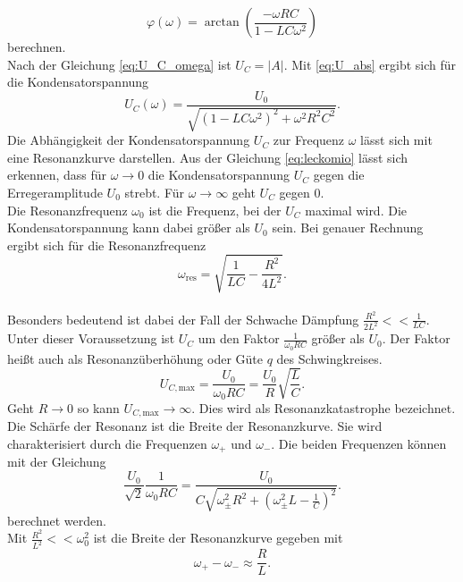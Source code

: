 \begin{equation}\label{eq:phi}
    φ(ω) = \arctan{\left(\frac{-ωRC}{1 - LCω^2}\right)}
\end{equation} berechnen.\\
Nach der Gleichung \eqref{eq:U_C_omega} ist $U_C = |A|.$ Mit \autoref{eq:U_abs} ergibt sich für die Kondensatorspannung
\begin{equation}\label{eq:leckomio}
    U_C(ω) = \frac{U_0}{\sqrt{\left(1 - LCω^2\right)^2 + ω^2R^2C^2}}.
\end{equation}
Die Abhängigkeit der Kondensatorspannung $U_C$ zur Frequenz $ω$ lässt sich mit eine Resonanzkurve darstellen.
Aus der Gleichung \eqref{eq:leckomio} lässt sich erkennen, dass für $ω \longrightarrow 0$ die Kondensatorspannung $U_C$ gegen die Erregeramplitude $U_0$ strebt.
Für $ω \longrightarrow \infty$ geht $U_C$ gegen $0.$\\
Die Resonanzfrequenz $ω_0$ ist die Frequenz, bei der $U_C$ maximal wird. Die Kondensatorspannung kann dabei größer als $U_0$ sein.
Bei genauer Rechnung ergibt sich für die Resonanzfrequenz
\begin{equation}\label{eq:wres}
    ω_{\text{res}} = \sqrt{\frac{1}{LC} - \frac{R^2}{4L^2}}.
\end{equation}\\
Besonders bedeutend ist dabei der Fall der Schwache Dämpfung $\frac{R^2}{2L^2} << \frac{1}{LC}.$\\
Unter dieser Voraussetzung ist $U_C$ um den Faktor $\frac{1}{ω_0RC}$ größer als $U_0.$ Der Faktor heißt auch als Resonanzüberhöhung oder Güte $q$ des Schwingkreises.\\
\begin{equation*}
    U_{C,\text{max}} = \frac{U_0}{ω_0RC} = \frac{U_0}{R}\sqrt{\frac{L}{C}}.
\end{equation*}
Geht $R \longrightarrow 0$ so kann $U_{C,\text{max}} \longrightarrow \infty.$ Dies wird als Resonanzkatastrophe bezeichnet.\\
Die Schärfe der Resonanz ist die Breite der Resonanzkurve. Sie wird charakterisiert durch die Frequenzen $ω_+$ und $ω_-$.
Die beiden Frequenzen können mit der Gleichung
\begin{equation*}
    \frac{U_0}{\sqrt{2}} \frac{1}{ω_0RC} = \frac{U_0}{C\sqrt{ω_{\pm}^2R^2 + \left(ω_{\pm}^2L - \frac{1}{C}\right)^2}}.
\end{equation*}
berechnet werden.\\
Mit $\frac{R^2}{L^2} << ω_0^2$ ist die Breite der Resonanzkurve gegeben mit
\begin{equation}\label{eq:gute}
    ω_+ - ω_- \approx \frac{R}{L}.
\end{equation}
